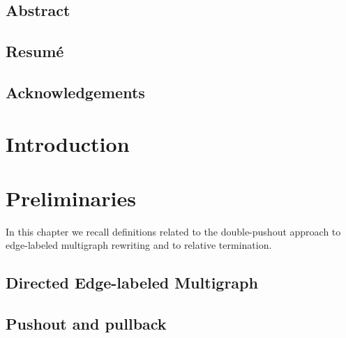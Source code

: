 \documentclass{report}
\begin{document}
  
   
  
 
\newpage
\section*{Abstract}

 
\newpage  
\section*{Resumé}
  
 
\newpage  
\section*{Acknowledgements} 

\newpage       
 
  
\tableofcontents   
\newpage      

\chapter{Introduction}  


\chapter{Preliminaries}
\label{chap:preliminaries}
In this chapter we recall definitions related to the double-pushout approach to edge-labeled multigraph rewriting and to relative termination. 
\section{Directed Edge-labeled Multigraph} 
\label{Preliminaries:Graphs}
 
\section{Pushout and pullback}  
\label{Preliminaries:Pushout}

\end{document}
